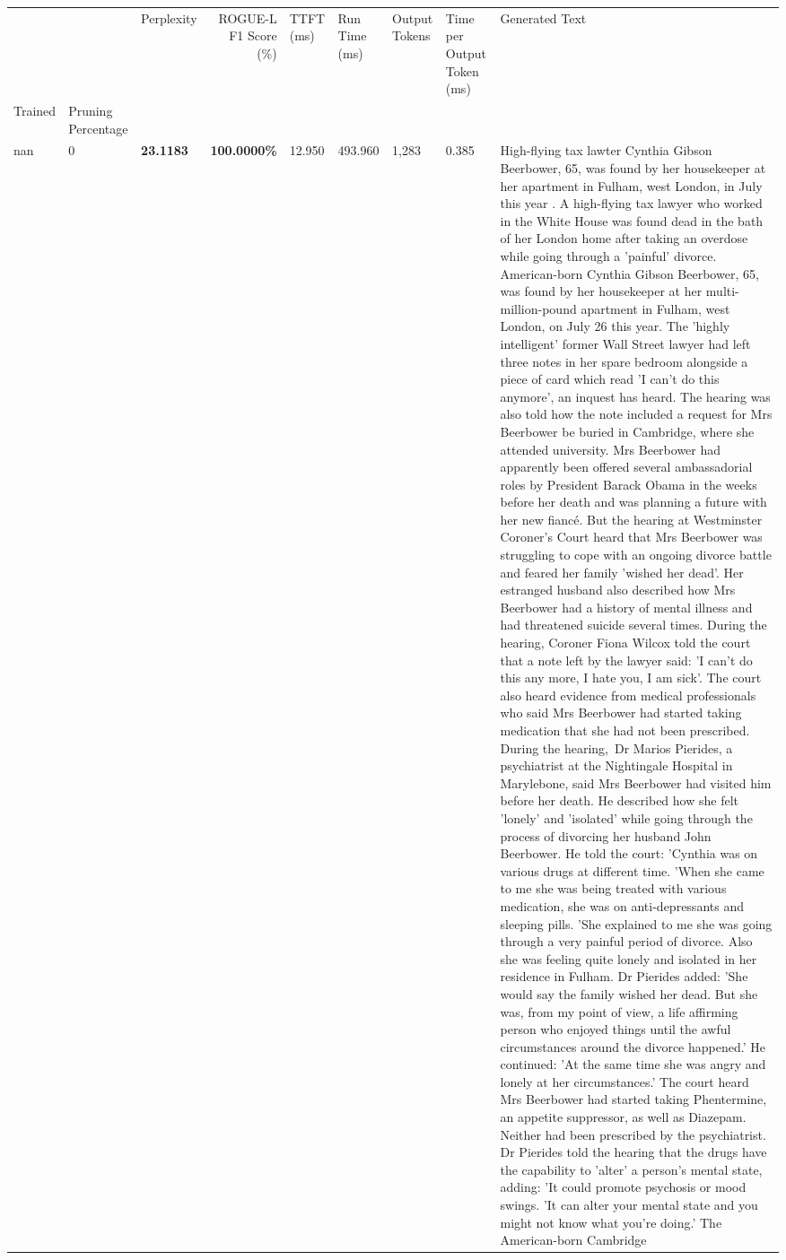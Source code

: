 \begin{table}[H]
\label{tab:evaluation-pipeline-13}
\begin{tabular}{lllrlllll}
\toprule
 &  & Perplexity & ROGUE-L F1 Score (\%) & TTFT (ms) & Run Time (ms) & Output Tokens & Time per Output Token (ms) & Generated Text \\
Trained & Pruning Percentage &  &  &  &  &  &  &  \\
\midrule
nan & 0 & \bfseries 23.1183 & \bfseries 100.0000\% & 12.950 & 493.960 & 1,283 & 0.385 & High-flying tax lawter Cynthia Gibson Beerbower, 65, was found by her housekeeper at her apartment in Fulham, west London, in July this year . A high-flying tax lawyer who worked in the White House was found dead in the bath of her London home after taking an overdose while going through a 'painful' divorce. American-born Cynthia Gibson Beerbower, 65, was found by her housekeeper at her multi-million-pound apartment in Fulham, west London, on July 26 this year. The 'highly intelligent' former Wall Street lawyer had left three notes in her spare bedroom alongside a piece of card which read 'I can't do this anymore', an inquest has heard. The hearing was also told how the note included a request for Mrs Beerbower be buried in Cambridge, where she attended university. Mrs Beerbower had apparently been offered several ambassadorial roles by President Barack Obama in the weeks before her death and was planning a future with her new fiancé. But the hearing at Westminster Coroner's Court heard that Mrs Beerbower was struggling to cope with an ongoing divorce battle and feared her family 'wished her dead'. Her estranged husband also described how Mrs Beerbower had a history of mental illness and had threatened suicide several times. During the hearing, Coroner Fiona Wilcox told the court that a note left by the lawyer said: 'I can't do this any more, I hate you, I am sick'. The court also heard evidence from medical professionals who said Mrs Beerbower had started taking medication that she had not been prescribed. During the hearing, Dr Marios Pierides, a psychiatrist at the Nightingale Hospital in Marylebone, said Mrs Beerbower had visited him before her death. He described how she felt 'lonely' and 'isolated' while going through the process of divorcing her husband John Beerbower. He told the court: 'Cynthia was on various drugs at different time. 'When she came to me she was being treated with various medication, she was on anti-depressants and sleeping pills. 'She explained to me she was going through a very painful period of divorce. Also she was feeling quite lonely and isolated in her residence in Fulham. Dr Pierides added: 'She would say the family wished her dead. But she was, from my point of view, a life affirming person who enjoyed things until the awful circumstances around the divorce happened.' He continued: 'At the same time she was angry and lonely at her circumstances.' The court heard Mrs Beerbower had started taking Phentermine, an appetite suppressor, as well as Diazepam. Neither had been prescribed by the psychiatrist. Dr Pierides told the hearing that the drugs have the capability to 'alter' a person's mental state, adding: 'It could promote psychosis or mood swings. 'It can alter your mental state and you might not know what you're doing.' The American-born Cambridge 
\end{tabular}
\end{table}
